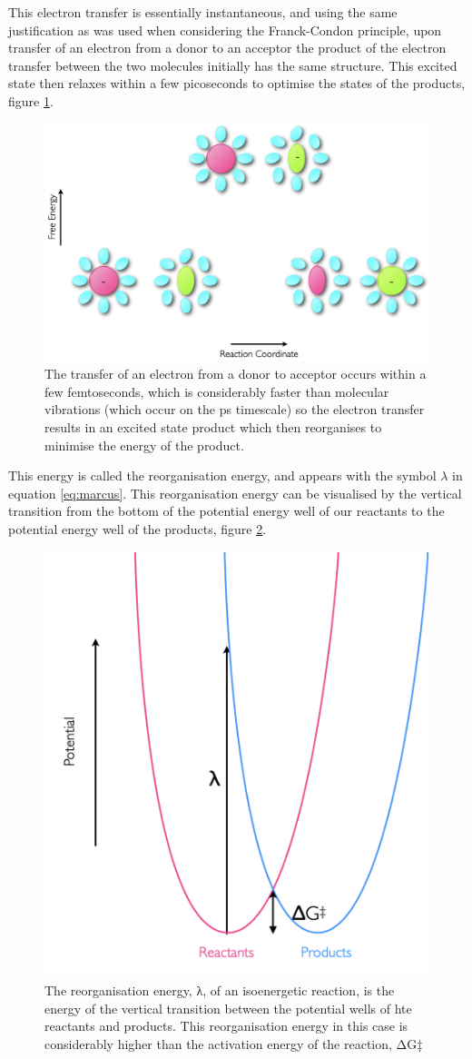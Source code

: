 \documentclass[
]{book}
\begin{document}
This electron transfer is essentially instantaneous, and using the same justification as was used when considering the Franck-Condon principle, upon transfer of an electron from a donor to an acceptor the product of the electron transfer between the two molecules initially has the same structure. This excited state then relaxes within a few picoseconds to optimise the states of the products, figure \ref{fig:electransreorg}.

\begin{figure}

{\centering \includegraphics[width=0.6\linewidth]{images/electransreorg} 

}

\caption{The transfer of an electron from a donor to acceptor occurs within a few femtoseconds, which is considerably faster than molecular vibrations (which occur on the ps timescale) so the electron transfer results in an excited state product which then reorganises to minimise the energy of the product.}\label{fig:electransreorg}
\end{figure}

This energy is called the reorganisation energy, and appears with the symbol \(\lambda\) in equation \eqref{eq:marcus}. This reorganisation energy can be visualised by the vertical transition from the bottom of the potential energy well of our reactants to the potential energy well of the products, figure \ref{fig:reorgen}.

\begin{figure}

{\centering \includegraphics[width=0.4\linewidth]{images/reorgen} 

}

\caption{The reorganisation energy, λ, of an isoenergetic reaction, is the energy of the vertical transition between the potential wells of hte reactants and products. This reorganisation energy in this case is considerably higher than the activation energy of the reaction, ΔG‡}\label{fig:reorgen}
\end{figure}
\end{document}
